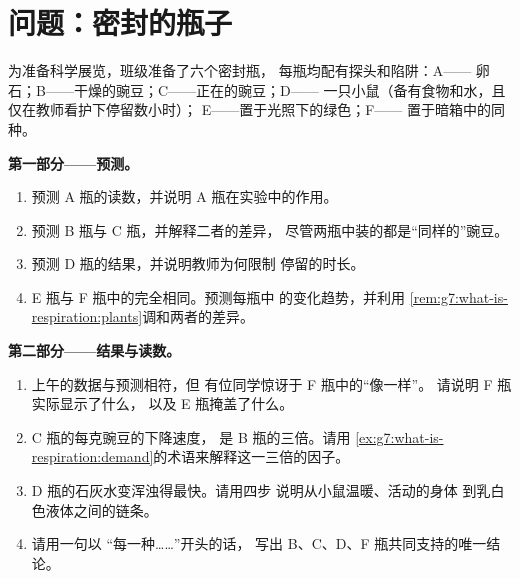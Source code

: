 \section{问题：密封的瓶子}

\begin{problem}\label{pb:g7:what-is-respiration:1}
为准备科学展览，班级准备了六个密封瓶，
每瓶均配有探头和陷阱：A——
卵石；B——干燥的豌豆；C——正在的豌豆；D——
一只小鼠（备有食物和水，且仅在教师看护下停留数小时）；
E——置于光照下的绿色；F——
置于暗箱中的同种。

\medskip\noindent\textbf{第一部分——预测。}
\begin{enumerate}
  \item 预测 A 瓶的读数，并说明
        A 瓶在实验中的作用。
  \item 预测 B 瓶与 C 瓶，并解释二者的差异，
        尽管两瓶中装的都是“同样的”豌豆。
  \item 预测 D 瓶的结果，并说明教师为何限制
        停留的时长。
  \item E 瓶与 F 瓶中的完全相同。预测每瓶中
        的变化趋势，并利用
        \cref{rem:g7:what-is-respiration:plants}调和两者的差异。
\end{enumerate}

\medskip\noindent\textbf{第二部分——结果与读数。}
\begin{enumerate}[resume]
  \item 上午的数据与预测相符，但
        有位同学惊讶于 F 瓶中的“像一样”。
        请说明 F 瓶实际显示了什么，
        以及 E 瓶掩盖了什么。
  \item C 瓶的每克豌豆的下降速度，
        是 B 瓶的三倍。请用
        \cref{ex:g7:what-is-respiration:demand}的术语来解释这一三倍的因子。
  \item D 瓶的石灰水变浑浊得最快。请用四步
        说明从小鼠温暖、活动的身体
        到乳白色液体之间的链条。
  \item 请用一句以
        “每一种……”开头的话，
        写出 B、C、D、F 瓶共同支持的唯一结论。
\end{enumerate}


\end{problem}
